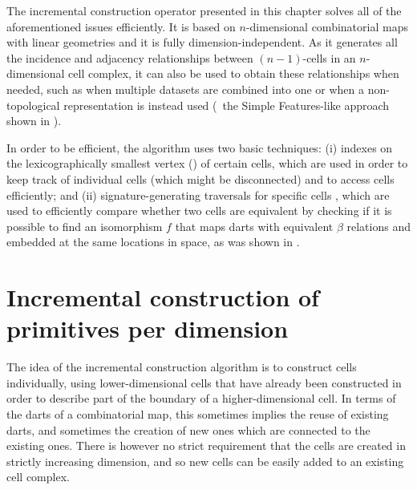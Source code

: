The incremental construction operator presented in this chapter solves all of the aforementioned issues efficiently.
It is based on $n$-dimensional combinatorial maps with linear geometries and it is fully dimension-independent.
As it generates all the incidence and adjacency relationships between $(n-1)$-cells in an $n$-dimensional cell complex, it can also be used to obtain these relationships when needed, such as when multiple datasets are combined into one or when a non-topological representation is instead used (\eg\ the Simple Features-like approach shown in ).

In order to be efficient, the algorithm uses two basic techniques: (i) indexes on the lexicographically smallest vertex () of certain cells, which are used in order to keep track of individual cells (which might be disconnected) and to access cells efficiently; and (ii) signature-generating traversals for specific cells \citep{Gosselin11}, which are used to efficiently compare whether two cells are equivalent by checking if it is possible to find an isomorphism $f$ that maps darts with equivalent $\beta$ relations and embedded at the same locations in space, as was shown in .

\section{Incremental construction of primitives per dimension}
\label{se:primitives}

The idea of the incremental construction algorithm is to construct cells individually, using lower-dimensional cells that have already been constructed in order to describe part of the boundary of a higher-dimensional cell.
In terms of the darts of a combinatorial map, this sometimes implies the reuse of existing darts, and sometimes the creation of new ones which are connected to the existing ones.
There is however no strict requirement that the cells are created in strictly increasing dimension, and so new cells can be easily added to an existing cell complex.

